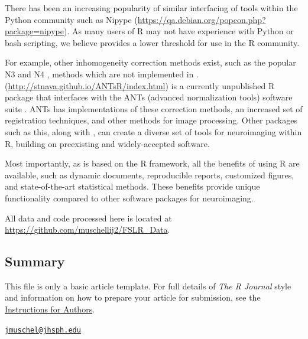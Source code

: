 There has been an increasing popularity of similar interfacing of tools
within the Python community such as Nipype
\citep{gorgolewski_nipype:_2011}
(\url{https://qa.debian.org/popcon.php?package=nipype}). As many users
of R may not have experience with Python or bash scripting, we believe
 provides a lower threshold for use in the R community.

For example, other inhomogeneity correction methods exist, such as the
popular N3 \citep{sled_nonparametric_1998} and N4
\citep{tustison_n4itk:_2010}, methods which are not implemented in
.  (\url{http://stnava.github.io/ANTsR/index.html})
is a currently unpublished R package that interfaces with the ANTs
(advanced normalization tools) software suite
\citep{avants_reproducible_2011}. ANTs has implementations of these
correction methods, an increased set of registration techniques, and
other methods for image processing. Other packages such as this, along
with , can create a diverse set of tools for neuroimaging
within R, building on preexisting and widely-accepted software.

Most importantly, as  is based on the R framework, all the
benefits of using R are available, such as dynamic documents,
reproducible reports, customized figures, and state-of-the-art
statistical methods. These benefits provide unique functionality
compared to other software packages for neuroimaging.

All data and code processed here is located at
\url{https://github.com/muschellij2/FSLR_Data}.

\subsection{Summary}\label{summary}

This file is only a basic article template. For full details of
\emph{The R Journal} style and information on how to prepare your
article for submission, see the
\href{https://journal.r-project.org/share/author-guide.pdf}{Instructions
for Authors}. 

\address{%
John Muschelli\\
Johns Hopkins Bloomberg School of Public Health\\
Department of Biostatistics\\ 615 N Wolfe St, Baltimore, MD, 21205\\
}
\href{mailto:jmuschel@jhsph.edu}{\nolinkurl{jmuschel@jhsph.edu}}

